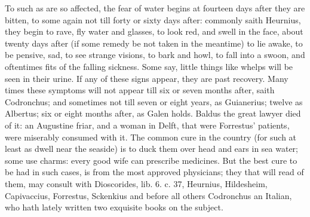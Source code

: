{To such as are so affected, the fear of water begins at fourteen days
after they are bitten, to some again not till forty or sixty days
after: commonly saith Heurnius, they begin to rave, fly water and
glasses, to look red, and swell in the face, about twenty days after
(if some remedy be not taken in the meantime) to lie awake, to be
pensive, sad, to see strange visions, to bark and howl, to fall into a
swoon, and oftentimes fits of the falling sickness.  Some say,
little things like whelps will be seen in their urine. If any of these
signs appear, they are past recovery. Many times these symptoms will
not appear till six or seven months after, saith Codronchus; and
sometimes not till seven or eight years, as Guianerius; twelve as
Albertus; six or eight months after, as Galen holds. Baldus the great
lawyer died of it: an Augustine friar, and a woman in Delft, that were
Forrestus' patients, were miserably consumed with it. The common
cure in the country (for such at least as dwell near the seaside) is to
duck them over head and ears in sea water; some use charms: every good
wife can prescribe medicines. But the best cure to be had in such
cases, is from the most approved physicians; they that will read of
them, may consult with Dioscorides, lib. 6. c. 37, Heurnius,
Hildesheim, Capivaccius, Forrestus, Sckenkius and before all others
Codronchus an Italian, who hath lately written two exquisite books on
the subject.

}
